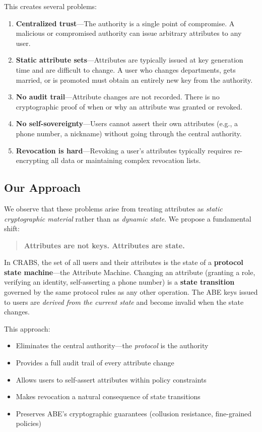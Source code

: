 \documentclass[sigconf,nonacm]{acmart}
\newcommand{\crab}{\textsc{CRABS}}
\begin{document}
This creates several problems:

\begin{enumerate}
    \item \textbf{Centralized trust}---The authority is a single point of compromise. A malicious or compromised authority can issue arbitrary attributes to any user.
    \item \textbf{Static attribute sets}---Attributes are typically issued at key generation time and are difficult to change. A user who changes departments, gets married, or is promoted must obtain an entirely new key from the authority.
    \item \textbf{No audit trail}---Attribute changes are not recorded. There is no cryptographic proof of when or why an attribute was granted or revoked.
    \item \textbf{No self-sovereignty}---Users cannot assert their own attributes (e.g., a phone number, a nickname) without going through the central authority.
    \item \textbf{Revocation is hard}---Revoking a user's attributes typically requires re-encrypting all data or maintaining complex revocation lists.
\end{enumerate}

\subsection{Our Approach}

We observe that these problems arise from treating attributes as \textit{static cryptographic material} rather than as \textit{dynamic state}. We propose a fundamental shift:

\begin{quote}
\textbf{Attributes are not keys. Attributes are state.}
\end{quote}

In \crab{}, the set of all users and their attributes is the state of a \textbf{protocol state machine}---the Attribute Machine. Changing an attribute (granting a role, verifying an identity, self-asserting a phone number) is a \textbf{state transition} governed by the same protocol rules as any other operation. The ABE keys issued to users are \textit{derived from the current state} and become invalid when the state changes.

This approach:
\begin{itemize}
    \item Eliminates the central authority---the \textit{protocol} is the authority
    \item Provides a full audit trail of every attribute change
    \item Allows users to self-assert attributes within policy constraints
    \item Makes revocation a natural consequence of state transitions
    \item Preserves ABE's cryptographic guarantees (collusion resistance, fine-grained policies)
\end{itemize}
\end{document}
